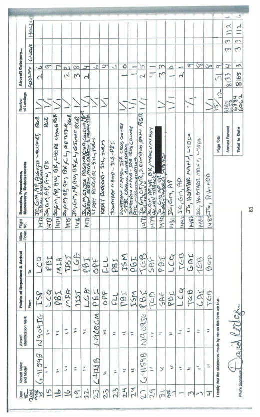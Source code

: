 \documentclass[10pt]{article}
\begin{document}
\includegraphics[max width=\textwidth, center]{2025_02_27_dd68c3d38de88f0516d9g-085}\\
\end{document}

